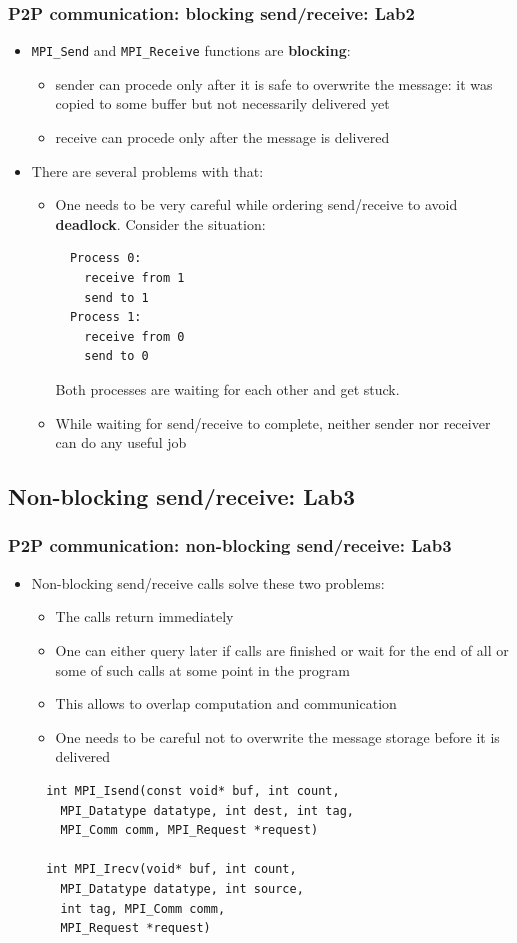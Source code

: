 \documentclass{beamer}
\begin{document}
\begin{frame}[fragile]
  \frametitle{P2P communication: blocking send/receive: Lab2}
\begin{itemize}
\item {\color{mycolorcode}\verb|MPI_Send|} and {\color{mycolorcode}\verb|MPI_Receive|} functions are {\color{mycolordef}\textbf{blocking}}: 
\begin{itemize}
\item sender can procede only after it is safe to overwrite the message: it was copied to some buffer but not necessarily delivered yet
\item receive can procede only after the message is delivered
\end{itemize}
\item There are several problems with that:
\begin{itemize}
\item One needs to be very careful while ordering send/receive to avoid {\color{mycolordef}\textbf{deadlock}}. Consider the situation:
\begin{verbatim}
  Process 0:
    receive from 1
    send to 1
  Process 1:
    receive from 0
    send to 0
\end{verbatim}
Both processes are waiting for each other and get stuck.
\item While waiting for send/receive to complete, neither sender nor receiver can do any useful job
\end{itemize}
\end{itemize}
\end{frame}

\subsection{Non-blocking send/receive: Lab3}
\begin{frame}[fragile]
  \frametitle{P2P communication: non-blocking send/receive: Lab3}
\begin{itemize}
\item Non-blocking send/receive calls solve these two problems:
\begin{itemize}
\item The calls return immediately
\item One can either query later if calls are finished or wait for the end of all or some of such calls at some point in the program
\item This allows to overlap computation and communication
\item One needs to be careful not to overwrite the message storage before it is delivered
\end{itemize}
{\color{mycolorcode}
\begin{verbatim}
  int MPI_Isend(const void* buf, int count, 
    MPI_Datatype datatype, int dest, int tag, 
    MPI_Comm comm, MPI_Request *request)

  int MPI_Irecv(void* buf, int count, 
    MPI_Datatype datatype, int source,
    int tag, MPI_Comm comm, 
    MPI_Request *request)
\end{verbatim}
}
\end{itemize}
\end{frame}
\end{document}
